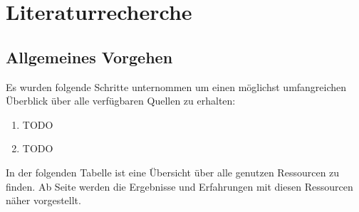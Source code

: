 \section{Literaturrecherche}

\subsection{Allgemeines Vorgehen}

Es wurden folgende Schritte unternommen um einen möglichst umfangreichen Überblick über alle verfügbaren Quellen zu erhalten:
\begin{enumerate}
\item TODO
\item TODO
\end{enumerate}
In der folgenden Tabelle ist eine Übersicht über alle genutzen Ressourcen zu finden. Ab Seite \pageref{startdetails} werden die Ergebnisse und Erfahrungen mit diesen Ressourcen näher vorgestellt.

